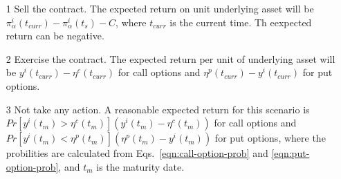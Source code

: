 \documentclass{article}
\begin{document}
\begin{itemize}

   \item[1] Sell the contract. The expected return on unit underlying
     asset will be $\pi^{i}_{\alpha}(t_{curr}) -
     \pi^{i}_{\alpha}(t_{s}) - C$, where $t_{curr}$ is the current
     time. Th eexpected return can be negative.

   \item[2] Exercise the contract. The expected return per unit of
     underlying asset will be $y^{i}(t_{curr}) - \eta^{c}(t_{curr})$
     for call options and $\eta^{p}(t_{curr}) - y^{i}(t_{curr})$ for
     put options.

   \item[3] Not take any action. A reasonable expected return for this
     scenario is $Pr[ y^{i}(t_{m}) > \eta^{c}(t_{m}) ] (y^{i}(t_{m}) -
     \eta^{c}(t_{m}))$ for call options and $Pr[ y^{i}(t_{m}) <
       \eta^{p}(t_{m}) ] (\eta^{p}(t_{m}) - y^{i}(t_{m}))$ for put
     options, where the probilities are calculated from
     Eqs.~\ref{eqn:call-option-prob} and \ref{eqn:put-option-prob},
     and $t_{m}$ is the maturity date.

\end{itemize}
\end{document}
